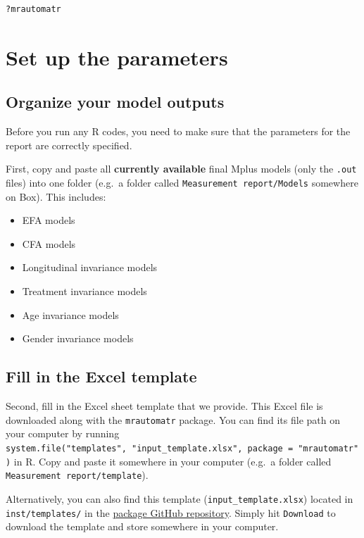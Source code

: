 \documentclass[
]{book}
\providecommand{\tightlist}{%
  \setlength{\itemsep}{0pt}\setlength{\parskip}{0pt}}
\begin{document}
\begin{verbatim}
?mrautomatr
\end{verbatim}

\hypertarget{set-up-the-parameters}{%
\chapter{Set up the parameters}\label{set-up-the-parameters}}

\hypertarget{organize-your-model-outputs}{%
\section{Organize your model outputs}\label{organize-your-model-outputs}}

Before you run any R codes, you need to make sure that the parameters for the report are correctly specified.

First, copy and paste all \textbf{currently available} final Mplus models (only the \texttt{.out} files) into one folder (e.g.~a folder called \texttt{Measurement\ report/Models} somewhere on Box). This includes:

\begin{itemize}
\tightlist
\item
  EFA models
\item
  CFA models
\item
  Longitudinal invariance models
\item
  Treatment invariance models
\item
  Age invariance models
\item
  Gender invariance models
\end{itemize}

\hypertarget{fill-in-the-excel-template}{%
\section{Fill in the Excel template}\label{fill-in-the-excel-template}}

Second, fill in the Excel sheet template that we provide. This Excel file is downloaded along with the \texttt{mrautomatr} package. You can find its file path on your computer by running \texttt{system.file("templates",\ "input\_template.xlsx",\ package\ =\ "mrautomatr")} in R. Copy and paste it somewhere in your computer (e.g.~a folder called \texttt{Measurement\ report/template}).

Alternatively, you can also find this template (\texttt{input\_template.xlsx}) located in \texttt{inst/templates/} in the \href{https://github.com/nyuglobalties/mrautomatr}{package GitHub repository}. Simply hit \texttt{Download} to download the template and store somewhere in your computer.
\end{document}
